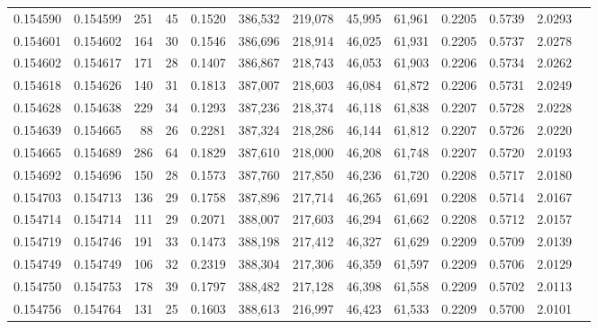 \begin{tabular}{rrrrrrrrrrrrr}
0.154590 & 0.154599 &   251 &  45 &                                     0.1520 & 386,532 & 219,078 &  45,995 &  61,961 & 0.2205 & 0.5739 & 2.0293 \\
0.154601 & 0.154602 &   164 &  30 &                                     0.1546 & 386,696 & 218,914 &  46,025 &  61,931 & 0.2205 & 0.5737 & 2.0278 \\
0.154602 & 0.154617 &   171 &  28 &                                     0.1407 & 386,867 & 218,743 &  46,053 &  61,903 & 0.2206 & 0.5734 & 2.0262 \\
0.154618 & 0.154626 &   140 &  31 &                                     0.1813 & 387,007 & 218,603 &  46,084 &  61,872 & 0.2206 & 0.5731 & 2.0249 \\
0.154628 & 0.154638 &   229 &  34 &                                     0.1293 & 387,236 & 218,374 &  46,118 &  61,838 & 0.2207 & 0.5728 & 2.0228 \\
0.154639 & 0.154665 &    88 &  26 &                                     0.2281 & 387,324 & 218,286 &  46,144 &  61,812 & 0.2207 & 0.5726 & 2.0220 \\
0.154665 & 0.154689 &   286 &  64 &                                     0.1829 & 387,610 & 218,000 &  46,208 &  61,748 & 0.2207 & 0.5720 & 2.0193 \\
0.154692 & 0.154696 &   150 &  28 &                                     0.1573 & 387,760 & 217,850 &  46,236 &  61,720 & 0.2208 & 0.5717 & 2.0180 \\
0.154703 & 0.154713 &   136 &  29 &                                     0.1758 & 387,896 & 217,714 &  46,265 &  61,691 & 0.2208 & 0.5714 & 2.0167 \\
0.154714 & 0.154714 &   111 &  29 &                                     0.2071 & 388,007 & 217,603 &  46,294 &  61,662 & 0.2208 & 0.5712 & 2.0157 \\
0.154719 & 0.154746 &   191 &  33 &                                     0.1473 & 388,198 & 217,412 &  46,327 &  61,629 & 0.2209 & 0.5709 & 2.0139 \\
0.154749 & 0.154749 &   106 &  32 &                                     0.2319 & 388,304 & 217,306 &  46,359 &  61,597 & 0.2209 & 0.5706 & 2.0129 \\
0.154750 & 0.154753 &   178 &  39 &                                     0.1797 & 388,482 & 217,128 &  46,398 &  61,558 & 0.2209 & 0.5702 & 2.0113 \\
0.154756 & 0.154764 &   131 &  25 &                                     0.1603 & 388,613 & 216,997 &  46,423 &  61,533 & 0.2209 & 0.5700 & 2.0101 \\

\end{tabular}
